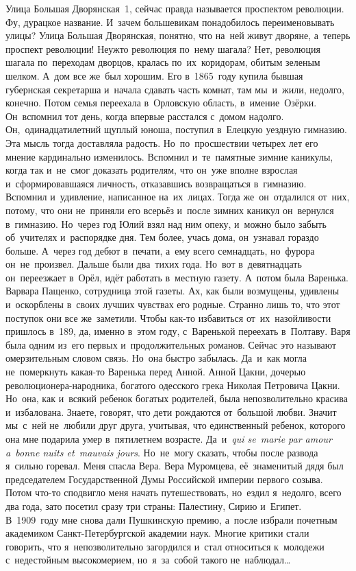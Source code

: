 Улица Большая Дворянская~1, сейчас правда называется проспектом революции.
Фу, дурацкое название.
И~зачем большевикам понадобилось переименовывать улицы? 
Улица Большая Дворянская, понятно, что на~ней живут дворяне, а~теперь проспект революции!
Неужто революция по~нему шагала? 
Нет, революция шагала по~переходам дворцов, кралась по~их~коридорам, обитым зеленым шелком.
А~дом все же~был хорошим.
Его в~1865~году купила бывшая губернская секретарша и~начала сдавать часть комнат, там мы~и~жили, недолго, конечно.
Потом семья переехала в~Орловскую область, в~имение~Озёрки.
Он~вспомнил тот день, когда впервые расстался с~домом надолго.
Он,~одинадцатилетний щуплый юноша, поступил в~Елецкую уездную гимназию.
Эта мысль тогда доставляла радость.
Но~по~просшествии четырех лет его мнение кардинально изменилось.
Вспомнил и~те~памятные зимние каникулы, когда так и~не~смог доказать родителям, что он~уже вполне взрослая и~сформировавшаяся личность, отказавшись возвращаться в~гимназию.
Вспомнил и~удивление, написанное на~их~лицах.
Тогда же~он~отдалился от~них, потому, что они не~приняли его всерьёз и~после зимних каникул он~вернулся в~гимназию.
Но~через год Юлий взял над ним опеку, и~можно было забыть об~учителях и~распорядке дня.
Тем более, учась дома, он~узнавал гораздо больше.
А~через год дебют в~печати, а~ему всего семнадцать, но~фурора он~не~произвел.
Дальше были два~тихих года.
Но~вот в~девятнадцать он~переезжает в~Орёл, идёт работать в~местную газету.
А~потом была Варенька.
Варвара Пащенко, сотрудница этой газеты.
Ах, как были возмущены, удивлены и~оскорблены в~своих лучших чувствах его родные.
Странно лишь то, что этот поступок они все же~заметили.
Чтобы как-то избавиться от~их~назойливости пришлось в~189, да, именно в~этом году, с~Варенькой переехать в~Полтаву.
Варя была одним из~его первых и~продолжительных романов.
Сейчас это называют омерзительным словом связь.
Но~она быстро забылась.
Да~и~как могла не~померкнуть какая-то Варенька перед Анной.
Анной Цакни, дочерью революционера-народника, богатого одесского грека Николая Петровича Цакни.
Но~она, как и~всякий ребенок богатых родителей, была непозволительно красива и~избалована.
Знаете, говорят, что дети рождаются от~большой любви.
Значит мы~с~ней не~любили друг друга, учитывая, что единственный ребенок, которого она мне подарила умер в~пятилетнем возрасте.
Да~и~\textit{qui se~marie par amour a~bonne nuits et~mauvais jours}.
Но~не~могу сказать, чтобы после развода я~сильно горевал.
Меня спасла Вера.
Вера Муромцева, её~знаменитый дядя был председателем Государственной Думы Российской империи первого созыва.
Потом что-то сподвигло меня начать путешествовать, но~ездил я~недолго, всего два года, зато посетил сразу три страны: Палестину, Сирию и~Египет.
В~1909~году мне снова дали Пушкинскую премию, а~после избрали почетным академиком Санкт-Петербургской академии наук.
Многие критики стали говорить, что я~непозволительно загордился и~стал относиться к~молодежи с~недестойным высокомерием, но~я~за~собой такого не~наблюдал…
 

